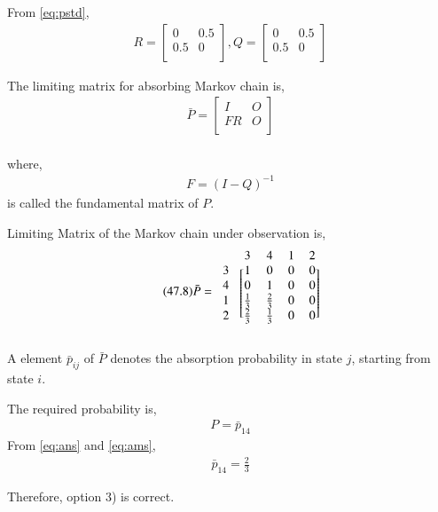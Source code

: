 \documentclass[journal,12pt,twocolumn]{IEEEtran}
\begin{document}
From \eqref{eq:pstd},
\begin{align}
\tag{47.5}
\label{eq:r,q}
    R=\begin{bmatrix}
    0 & 0.5\\
    0.5 & 0\\
    \end{bmatrix},
    Q=\begin{bmatrix}
    0 & 0.5 \\
    0.5 & 0 \\
    \end{bmatrix}
\end{align}
\begin{definition}
The limiting matrix for absorbing Markov chain is,
\begin{align}
\tag{47.6}
\label{eq:pbar}
    \bar P=\begin{bmatrix}
    I & O\\
    FR & O\\
    \end{bmatrix}
\end{align}
\\where,
\begin{align}
\tag{47.7}
\label{eq:f}
    F=(I-Q)^{-1}
\end{align}
is called the fundamental matrix of $P$. \\
\end{definition}
\begin{corollary}
Limiting Matrix of the Markov chain under observation is, 
\begin{align} 
\tag{47.8}
\label{eq:ans}
    \bar P=\begin{blockarray}{ccccc}
&3 &4 &1 &2\\
\begin{block}{c[cccc]}
    3 & 1 & 0 & 0 & 0  \\
    4 & 0 & 1 & 0 & 0  \\
    1 & \frac{1}{3} & \frac{2}{3} & 0 & 0 \\
    2 & \frac{2}{3} & \frac{1}{3} & 0 & 0 \\
   \end{block}
\end{blockarray}
\end{align}
\end{corollary}
\begin{definition}
A element $\bar p_{ij}$ of $\bar P$ denotes the absorption probability in state $j$, starting from state $i$.
\end{definition}
\begin{corollary}
The required probability is,
\begin{align}
\tag{47.9}
\label{eq:ams}
P =\bar p_{14}
\end{align}
From \eqref{eq:ans} and \eqref{eq:ams},
\begin{align}
\tag{47.10}
\bar p_{14}=\frac{2}{3}
\end{align}
\end{corollary}
Therefore, option 3) is correct.\\
\end{document}
